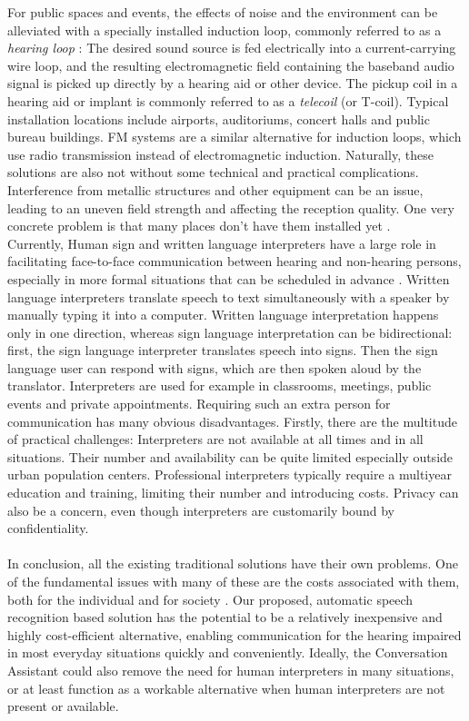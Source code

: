 \documentclass[english, 12pt, a4paper, pdftex, elec, utf8]{aaltothesis}
\begin{document}
For public spaces and events, the effects of noise and the environment can be alleviated with a specially installed induction loop, commonly referred to as a \textit{hearing loop} \cite{salonen2013hearing}: The desired sound source is fed electrically into a current-carrying wire loop, and the resulting electromagnetic field containing the baseband audio signal is picked up directly by a hearing aid or other device. The pickup coil in a hearing aid or implant is commonly referred to as a \textit{telecoil} (or T-coil). Typical installation locations include airports, auditoriums, concert halls and public bureau buildings. FM systems are a similar alternative for induction loops, which use radio transmission instead of electromagnetic induction. Naturally, these solutions are also not without some technical and practical complications. Interference from metallic structures and other equipment can be an issue, leading to an uneven field strength and affecting the reception quality. One very concrete problem is that many places don't have them installed yet \cite{healy2016difficulty, wilson2017global}. \\
Currently, Human sign and written language interpreters have a large role in facilitating face-to-face communication between hearing and non-hearing persons, especially in more formal situations that can be scheduled in advance \cite{raino2012sisakorvaistutteen, pereira2010communication}. Written language interpreters translate speech to text simultaneously with a speaker by manually typing it into a computer. Written language interpretation happens only in one direction, whereas sign language interpretation can be bidirectional: first, the sign language interpreter translates speech into signs. Then the sign language user can respond with signs, which are then spoken aloud by the translator. Interpreters are used for example in classrooms, meetings, public events and private appointments. Requiring such an extra person for communication has many obvious disadvantages. Firstly, there are the multitude of practical challenges: Interpreters are not available at all times and in all situations. Their number and availability can be quite limited especially outside urban population centers. Professional interpreters typically require a multiyear education and training, limiting their number and introducing costs. Privacy can also be a concern, even though interpreters are customarily bound by confidentiality. \cite{pereira2010communication} \\\\
In conclusion, all the existing traditional solutions have their own problems. One of the fundamental issues with many of these are the costs associated with them, both for the individual and for society \cite{wilson2017global}. Our proposed, automatic speech recognition based solution has the potential to be a relatively inexpensive and highly cost-efficient alternative, enabling communication for the hearing impaired in most everyday situations quickly and conveniently. Ideally, the Conversation Assistant could also remove the need for human interpreters in many situations, or at least function as a workable alternative when human interpreters are not present or available.
\end{document}
